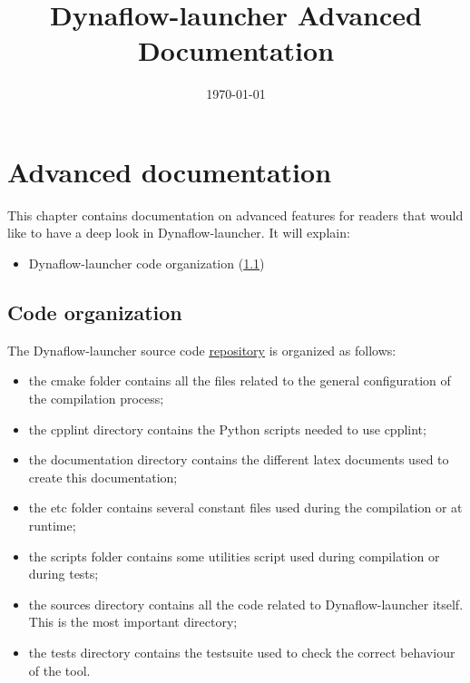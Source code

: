 \documentclass[a4paper, 12pt]{report}
\begin{document}
\title{Dynaflow-launcher Advanced Documentation}
\date\today

\maketitle
\tableofcontents

\chapter{Advanced documentation}

This chapter contains documentation on advanced features for readers that would like to have a deep look in Dynaflow-launcher.
It will explain:
\begin{itemize}
\item Dynaflow-launcher code organization (\ref{Dynaflow_Launcher_Advanced_Documentation_Code_Organization})
\end{itemize}

\section{Code organization}
\label{Dynaflow_Launcher_Advanced_Documentation_Code_Organization}

The Dynaflow-launcher source code \href{https://github.com/dynawo/dynaflow-launcher.git}
{\underline{repository}} is organized as follows:
\begin{itemize}
\item the cmake folder contains all the files related to the general
configuration of the compilation process;
\item the cpplint directory contains the Python scripts needed to use cpplint;
\item the documentation directory contains the different latex documents used to
create this documentation;
\item the etc folder contains several constant files used during the compilation or at runtime;
\item the scripts folder contains some utilities script used during compilation or during tests;
\item the sources directory contains all the code related to Dynaflow-launcher itself. This is the most important directory;
\item the tests directory contains the testsuite used to check the correct
behaviour of the tool.
\end{itemize}
\end{document}
